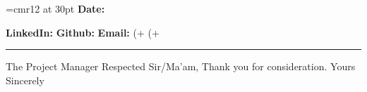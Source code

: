\documentclass{article}
\begin{document}
    
    \title{}
    
    \noindent
    \begin{minipage}[c]{0.7 \linewidth}
        \font\myfont=cmr12 at 30pt
            {\flushleft{
                            \myfont{%
			    \newline \newline }}
                            \textbf{Date:} %
                        }
    \end{minipage}
    \begin{minipage}[c]{0.3 \linewidth}
        \begin{flushright}
            \mbox{}\hfill \textbf{LinkedIn:} %
			\newline
            \mbox{}\hfill \textbf{Github:} %
			\newline
            \mbox{}\hfill \textbf{Email:} %
			\newline
            \mbox{}\hfill (+%
			\newline
            \mbox{}\hfill (+%
			\newline
        \end{flushright}
    \end{minipage}
    
    \hrule
    \newline
    
    \begin{flushleft}
        The Project Manager 
	\newline
	\newline
	\newline
        \newline
        Respected Sir/Ma'am,
        \newline\newline
        \newline\newline
        \newline\newline
        \newline\newline
        \newline\newline
        \newline\newline
        Thank you for consideration.
        \newline
        Yours Sincerely
        \newline\
    
    \end{flushleft}
        
\end{document}
